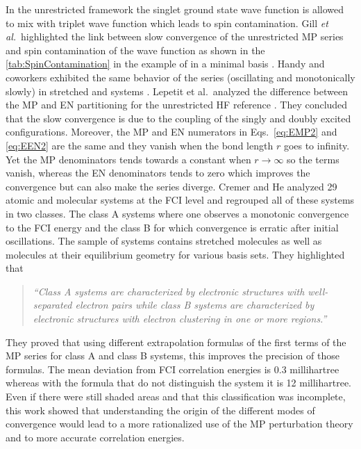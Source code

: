 \documentclass[11pt,a4paper]{article}
\begin{document}
In the unrestricted framework the singlet ground state wave function is allowed to mix with triplet wave function which leads to spin contamination. Gill \textit{et al.}~highlighted the link between slow convergence of the unrestricted MP series and spin contamination of the wave function as shown in the \autoref{tab:SpinContamination} in the example of  in a minimal basis \cite{Gill_1988}. 
Handy and coworkers exhibited the same behavior of the series (oscillating and monotonically slowly) in stretched  and  systems \cite{Handy_1985}. Lepetit et al.~analyzed the difference between the MP and EN partitioning for the unrestricted HF reference \cite{Lepetit_1988}. They concluded that the slow convergence is due to the coupling of the singly and doubly excited configurations. Moreover, the MP and EN numerators in Eqs.~\eqref{eq:EMP2} and \eqref{eq:EEN2} are the same and they vanish when the bond length $r$ goes to infinity. Yet the MP denominators tends towards a constant when $r \to \infty$ so the terms vanish, whereas the EN denominators tends to zero which improves the convergence but can also make the series diverge.
Cremer and He analyzed 29 atomic and molecular systems at the FCI level \cite{Cremer_1996} and regrouped all of these systems in two classes. The class A systems where one observes a monotonic convergence to the FCI energy and the class B for which convergence is erratic after initial oscillations. The sample of systems contains stretched molecules as well as molecules at their equilibrium geometry for various basis sets. They highlighted that \cite{Cremer_1996}
\begin{quote}
	\textit{``Class A systems are characterized by electronic structures with well-separated electron pairs while class B systems are characterized by electronic structures with electron clustering in one or more regions.''}
\end{quote}
They proved that using different extrapolation formulas of the first terms of the MP series for class A and class B systems, this improves the precision of those formulas. The mean deviation from FCI correlation energies is $0.3$ millihartree whereas with the formula that do not distinguish the system it is 12 millihartree. Even if there were still shaded areas and that this classification was incomplete, this work showed that understanding the origin of the different modes of convergence would lead to a more rationalized use of the MP perturbation theory and to more accurate correlation energies.
\end{document}
